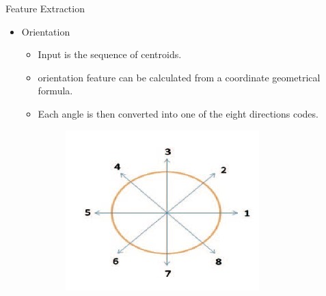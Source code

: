 \documentclass{beamer}
\begin{document}
\begin{frame}{Feature Extraction}
\begin{itemize}
\item Orientation 
\begin{itemize}
 \item Input is the sequence of centroids.
 \linebreak
 \item orientation feature can be calculated from a coordinate
geometrical formula.
\linebreak
\item Each angle is then converted into one of the eight directions
codes.
\begin{figure}
  \begin{center}
  \includegraphics[scale=0.5]{images/ori1.jpg}
  \end{center}
  \end{figure}

  

\end{itemize}
\end{itemize}
\end{frame}
\end{document}
